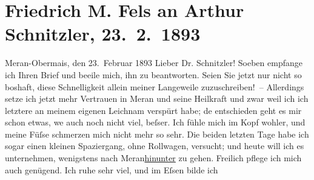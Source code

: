 

         
         \renewcommand{\erwaehntePersonen}{Personen:  ?? [Vermieterin von F. M. Fels], Peter Altenberg, Richard Beer-Hofmann, Friedrich Michael Fels, Ludwig Gelber, Hugo von Hofmannsthal, Felix Salten, Joseph Schreiber, Josef Steinbach}
         \renewcommand{\erwaehnteInstitutionen}{Institutionen: Dr. A. Gude GmbH.}
         \renewcommand{\erwaehnteOrte}{Orte: Leipzig, Meran, Obermais, Wien}
         \renewcommand{\erwaehnteWerke}{}
               \section[Friedrich M. Fels an Arthur Schnitzler, 23. 2. 1893]{ Friedrich M. Fels an Arthur Schnitzler, 23. 2. 1893}\nopagebreak{}\rehead{ }\begin{ledgroupsized}[t]{13cm}\normalsize\beginnumbering{} \toendnotes[C]{\smallbreak\pagebreak[2]} 
\toendnotes[C]{\smallbreak}\pstart
           \raggedleft{}{\pb}Meran-Obermais, den 23. Februar
                     1893\pend
           \pstart\center{}Lieber Dr. Schnitzler!\pend\pstart
           Soeben empfange ich Ihren Brief und beeile mich, ihn zu beantworten. Seien Sie jetzt
               nur nicht so boshaft, diese Schnelligkeit allein meiner Langeweile
               zuzuschreiben! –\pend
           \pstart
           Allerdings setze ich jetzt mehr Vertrauen in Meran und seine Heilkraft und zwar weil ich ich letztere an meinem eigenen
               Leichnam verspürt habe; de{\geminationn} entschieden geht es mir
               schon etwas, we{\geminationn} auch noch nicht viel, beſser. Ich fühle
               mich im Kopf wohler, und meine Füſse schmerzen mich nicht mehr so sehr. Die beiden
               letzten Tage habe ich sogar einen kleinen Spaziergang, ohne Rollwagen, versucht; und
               heute will ich es unternehmen, wenigstens nach Meran\uline{hinunter} zu gehen.\pend
           \pstart
           Freilich pflege ich mich auch genügend. Ich ruhe sehr viel, und im Eſsen bilde ich

\end{ledgroupsized}
